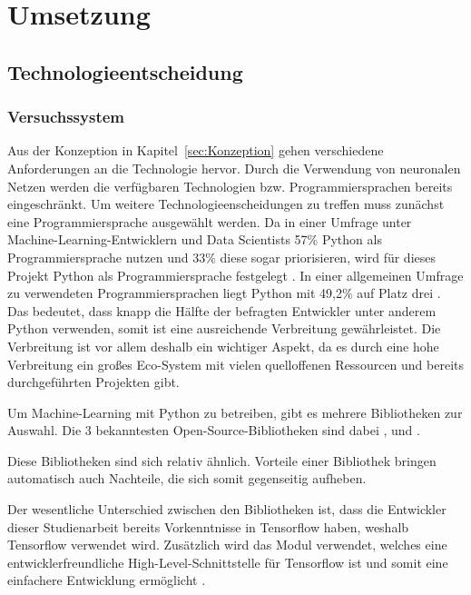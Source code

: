 \section{Umsetzung}

\subsection{Technologieentscheidung}
\subsubsection{Versuchssystem}\label{sec:TechnologieVersuchssystem}
Aus der Konzeption in Kapitel~\ref{sec:Konzeption} gehen verschiedene Anforderungen an die Technologie hervor.
Durch die Verwendung von neuronalen Netzen werden die verfügbaren Technologien bzw. Programmiersprachen bereits eingeschränkt.
Um weitere Technologieenscheidungen zu treffen muss zunächst eine Programmiersprache ausgewählt werden.
Da in einer Umfrage unter Machine-Learning-Entwicklern und Data Scientists 57\% Python als Programmiersprache nutzen und 33\% diese sogar priorisieren, wird für dieses Projekt Python als Programmiersprache festgelegt \autocite[vgl. ][S. 16]{vision_mobile_state_2017}.
In einer allgemeinen Umfrage zu verwendeten Programmiersprachen liegt Python mit 49,2\% auf Platz drei \autocite[vgl.][]{yepis_2023_2023}.
Das bedeutet, dass knapp die Hälfte der befragten Entwickler unter anderem Python verwenden, somit ist eine ausreichende Verbreitung gewährleistet.
Die Verbreitung ist vor allem deshalb ein wichtiger Aspekt, da es durch eine hohe Verbreitung ein großes Eco-System mit vielen quelloffenen Ressourcen und bereits durchgeführten Projekten gibt.

Um Machine-Learning mit Python zu betreiben, gibt es mehrere Bibliotheken zur Auswahl.
Die 3 bekanntesten Open-Source-Bibliotheken sind dabei ,  und  \autocite[vgl.][]{msv_tensorflow_2020}.

Diese Bibliotheken sind sich relativ ähnlich.
Vorteile einer Bibliothek bringen automatisch auch Nachteile, die sich somit gegenseitig aufheben.

Der wesentliche Unterschied zwischen den Bibliotheken ist, dass die Entwickler dieser Studienarbeit bereits Vorkenntnisse in Tensorflow haben, weshalb Tensorflow verwendet wird.
Zusätzlich wird das Modul  verwendet, welches eine entwicklerfreundliche High-Level-Schnittstelle für Tensorflow ist und somit eine einfachere Entwicklung ermöglicht \autocite[vgl.][]{noauthor_keras_2023}.


